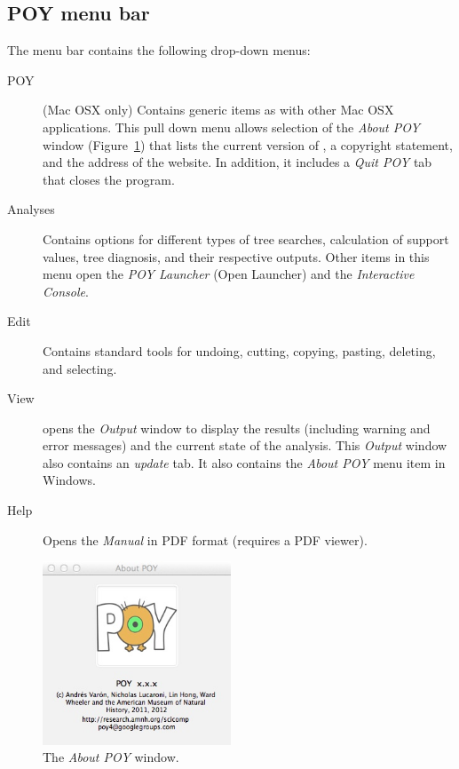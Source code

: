 \subsection{POY menu bar}
The menu bar contains the following drop-down menus:
\begin{description}
\item[POY] (Mac OSX only) Contains generic items as with other Mac OSX applications. This pull down 
menu allows selection of the \emph{About POY} window (Figure~\ref{fig:about_window}) that lists the 
current version of \poy, a copyright statement, and the address of the \poy website. In addition, it includes 
a \emph{Quit POY} tab that closes the program. 
\item[Analyses]    Contains options for different types of tree searches, calculation of support values, tree 
diagnosis, and their respective outputs. Other items in this menu open the \emph{POY Launcher} 
(Open Launcher) and the \emph{Interactive Console}.
\item[Edit] Contains standard tools for undoing, cutting, copying, pasting, deleting, and selecting.
\item[View] opens the \emph{Output} window to display the results (including warning and error messages) 
and the current state of the analysis. This \emph{Output} window also contains an \emph{update} tab.  
It also contains the \emph{About POY} menu item in Windows. %
\item[Help] Opens the \poy \emph{Manual} in PDF format (requires a PDF viewer).
\end{description}

\begin{figure}[htpb]
\begin{center}
\includegraphics[width=0.5\textwidth]{doc/figures/about_window.jpg}
\end{center}
\caption{The \emph{About POY} window.}
\label{fig:about_window}

\end{figure}

